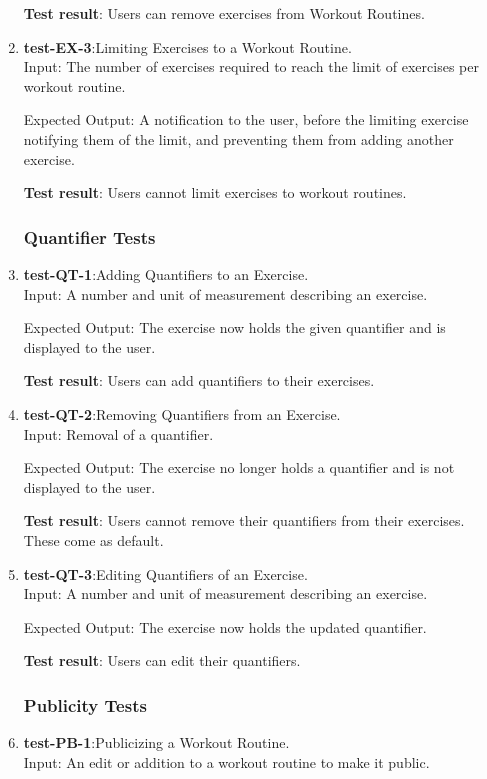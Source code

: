 \documentclass[12pt, titlepage]{article}
\begin{document}
\begin{enumerate}
    \textbf{Test result}: Users can remove exercises from Workout Routines.
   
    \item{\textbf{test-EX-3}}:Limiting Exercises to a Workout Routine.\\
    Input: The number of exercises required to reach the limit of exercises per workout routine. 
	
    Expected Output: A notification to the user, before the limiting exercise notifying them of the limit, and preventing them from adding another exercise.
    
    \textbf{Test result}: Users cannot limit exercises to workout routines.
   
\subsubsection{Quantifier Tests}
    \item{\textbf{test-QT-1}}:Adding Quantifiers to an Exercise.\\
    Input: A number and unit of measurement describing an exercise.
	
    Expected Output: The exercise now holds the given quantifier and is displayed to the user.
    
    \textbf{Test result}: Users can add quantifiers to their exercises.
   
    \item{\textbf{test-QT-2}}:Removing Quantifiers from an Exercise.\\
    Input: Removal of a quantifier.
	
    Expected Output: The exercise no longer holds a quantifier and is not displayed to the user.
    
    \textbf{Test result}: Users cannot remove their quantifiers from their exercises. These come as default.
   
    \item{\textbf{test-QT-3}}:Editing Quantifiers of an Exercise.\\
    Input: A number and unit of measurement describing an exercise.

    Expected Output: The exercise now holds the updated quantifier.
    
    \textbf{Test result}: Users can edit their quantifiers.
   
\subsubsection{Publicity Tests}
    \item{\textbf{test-PB-1}}:Publicizing a Workout Routine.\\
    Input: An edit or addition to a workout routine to make it public.
	

\end{enumerate}
\end{document}
